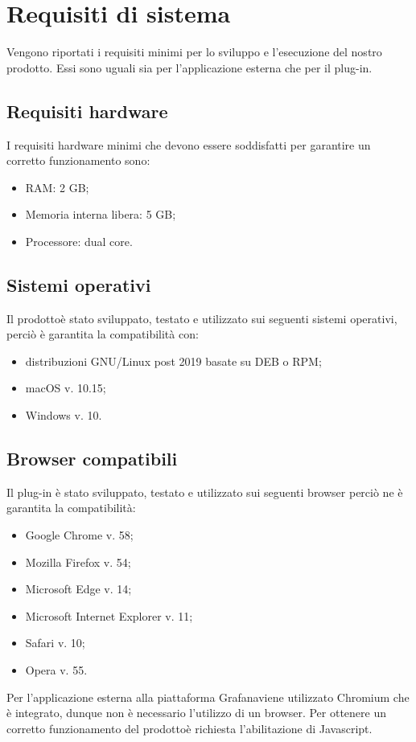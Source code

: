 \section{Requisiti di sistema}
Vengono riportati i requisiti minimi per lo sviluppo e l'esecuzione del nostro prodotto\glo. Essi sono uguali sia per l'applicazione esterna che per il plug-in.

\subsection{Requisiti hardware}
I requisiti hardware minimi che devono essere soddisfatti per garantire un corretto funzionamento sono:
\begin{itemize}
	\item RAM: 2 GB;
	\item Memoria interna libera: 5 GB;
	\item Processore: dual core.
\end{itemize}

\subsection{Sistemi operativi}
Il prodotto\glosp è stato sviluppato, testato e utilizzato sui seguenti sistemi operativi, perciò è garantita la compatibilità con:
\begin{itemize}
	\item distribuzioni GNU/Linux post 2019 basate su DEB o RPM;
	\item macOS v. 10.15;
	\item Windows v. 10.
\end{itemize}

\subsection{Browser compatibili}
Il plug-in è stato sviluppato, testato e utilizzato sui seguenti browser perciò ne è garantita la compatibilità:
\begin{itemize}
	\item Google Chrome v. 58;
	\item Mozilla Firefox v. 54;
	\item Microsoft Edge v. 14;
	\item Microsoft Internet Explorer v. 11;
	\item Safari v. 10;
	\item Opera v. 55.
\end{itemize}
Per l'applicazione esterna alla piattaforma Grafana\glosp viene utilizzato Chromium che è integrato, dunque non è necessario l'utilizzo di un browser.
Per ottenere un corretto funzionamento del prodotto\glosp è richiesta l'abilitazione di Javascript.
